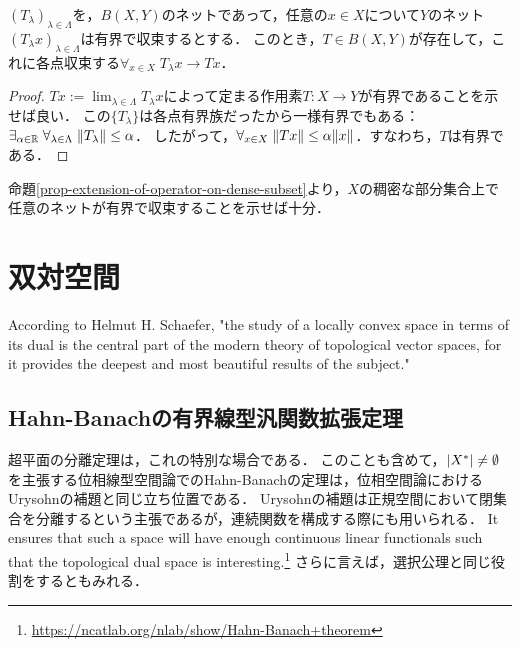 \documentclass[uplatex,dvipdfmx]{jsreport}
\begin{document}
\begin{corollary}[作用素ネットが各点有界であることの十分条件]
    $(T_\lambda)_{\lambda\in\Lambda}$を，$B(X,Y)$のネットであって，任意の$x\in X$について$Y$のネット$(T_\lambda x)_{\lambda\in\Lambda}$は有界で収束するとする．
    このとき，$T\in B(X,Y)$が存在して，これに各点収束する$\forall_{x\in X}\;T_\lambda x\to Tx$．
\end{corollary}
\begin{proof}
    $Tx:=\lim_{\lambda\in\Lambda}T_\lambda x$によって定まる作用素$T:X\to Y$が有界であることを示せば良い．
    この$\{T_\lambda\}$は各点有界族だったから一様有界でもある：$\exists_{\alpha\in\mathbb{R}}\;\forall_{\lambda\in\Lambda}\;\|T_\lambda\|\le\alpha$．
    したがって，$\forall_{x\in X}\;\|Tx\|\le\alpha\|x\|$．すなわち，$T$は有界である．
\end{proof}
\begin{remark}
    命題\ref{prop-extension-of-operator-on-dense-subset}より，$X$の稠密な部分集合上で任意のネットが有界で収束することを示せば十分．

\end{remark}

\section{双対空間}

\begin{tcolorbox}[colframe=ForestGreen, colback=ForestGreen!10!white,breakable,colbacktitle=ForestGreen!40!white,coltitle=black,fonttitle=\bfseries\sffamily,
title=]
According to Helmut H. Schaefer, "the study of a locally convex space in terms of its dual is the central part of the modern theory of topological vector spaces, for it provides the deepest and most beautiful results of the subject."
\end{tcolorbox}

\subsection{Hahn-Banachの有界線型汎関数拡張定理}

\begin{tcolorbox}[colframe=ForestGreen, colback=ForestGreen!10!white,breakable,colbacktitle=ForestGreen!40!white,coltitle=black,fonttitle=\bfseries\sffamily,
title=双対空間の元の存在]
    超平面の分離定理は，これの特別な場合である．
    このことも含めて，$\lvert X^*\rvert\ne\emptyset$を主張する位相線型空間論でのHahn-Banachの定理は，位相空間論におけるUrysohnの補題と同じ立ち位置である．
    Urysohnの補題は正規空間において閉集合を分離するという主張であるが，連続関数を構成する際にも用いられる．
    It ensures that such a space will have enough continuous linear functionals such that the topological dual space is interesting.\footnote{\url{https://ncatlab.org/nlab/show/Hahn-Banach+theorem}}
    さらに言えば，選択公理と同じ役割をするともみれる．
\end{tcolorbox}
\end{document}
